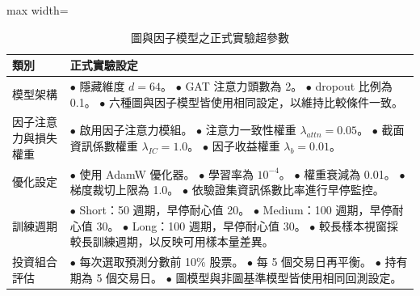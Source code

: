 \begin{table}[H]
\centering
\caption{圖與因子模型之正式實驗超參數}
\label{tab:factor_model_hyperparameters}
\small
\begin{adjustbox}{max width=\textwidth}
\begin{tabular}{p{3.0cm} p{12.0cm}}
\toprule
類別 & 正式實驗設定 \\
\midrule
模型架構 &
\(\bullet\) 隱藏維度 \(d=64\)。\newline
\(\bullet\) GAT 注意力頭數為 2。\newline
\(\bullet\) dropout 比例為 0.1。\newline
\(\bullet\) 六種圖與因子模型皆使用相同設定，以維持比較條件一致。 \\
因子注意力與損失權重 &
\(\bullet\) 啟用因子注意力模組。\newline
\(\bullet\) 注意力一致性權重 \(\lambda_{attn}=0.05\)。\newline
\(\bullet\) 截面資訊係數權重 \(\lambda_{IC}=1.0\)。\newline
\(\bullet\) 因子收益權重 \(\lambda_b=0.01\)。 \\
優化設定 &
\(\bullet\) 使用 AdamW 優化器。\newline
\(\bullet\) 學習率為 \(10^{-4}\)。\newline
\(\bullet\) 權重衰減為 0.01。\newline
\(\bullet\) 梯度裁切上限為 1.0。\newline
\(\bullet\) 依驗證集資訊係數比率進行早停監控。 \\
訓練週期 &
\(\bullet\) Short：50 週期，早停耐心值 20。\newline
\(\bullet\) Medium：100 週期，早停耐心值 30。\newline
\(\bullet\) Long：100 週期，早停耐心值 30。\newline
\(\bullet\) 較長樣本視窗採較長訓練週期，以反映可用樣本量差異。 \\
投資組合評估 &
\(\bullet\) 每次選取預測分數前 10\% 股票。\newline
\(\bullet\) 每 5 個交易日再平衡。\newline
\(\bullet\) 持有期為 5 個交易日。\newline
\(\bullet\) 圖模型與非圖基準模型皆使用相同回測設定。 \\
\bottomrule
\end{tabular}
\end{adjustbox}
\end{table}


